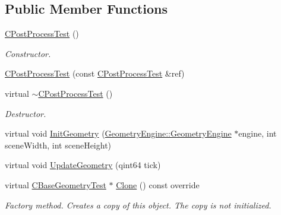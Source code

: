 \subsection*{Public Member Functions}
\begin{DoxyCompactItemize}
\item 
\mbox{\label{class_unit_test_1_1_c_post_process_test_a9e9ed13f9e0dd0322f409a02cab748f5}} 
\mbox{\hyperlink{class_unit_test_1_1_c_post_process_test_a9e9ed13f9e0dd0322f409a02cab748f5}{C\+Post\+Process\+Test}} ()
\begin{DoxyCompactList}\small\item\em Constructor. \end{DoxyCompactList}\item 
\mbox{\hyperlink{class_unit_test_1_1_c_post_process_test_ab432ec90a2fe56772f244e0640d55c37}{C\+Post\+Process\+Test}} (const \mbox{\hyperlink{class_unit_test_1_1_c_post_process_test}{C\+Post\+Process\+Test}} \&ref)
\item 
\mbox{\label{class_unit_test_1_1_c_post_process_test_ab034d618f83ac4640a20b98a3c12b2f2}} 
virtual \mbox{\hyperlink{class_unit_test_1_1_c_post_process_test_ab034d618f83ac4640a20b98a3c12b2f2}{$\sim$\+C\+Post\+Process\+Test}} ()
\begin{DoxyCompactList}\small\item\em Destructor. \end{DoxyCompactList}\item 
virtual void \mbox{\hyperlink{class_unit_test_1_1_c_post_process_test_ab88ae9fbbdcee0f63328d73f9b5e499d}{Init\+Geometry}} (\mbox{\hyperlink{class_geometry_engine_1_1_geometry_engine}{Geometry\+Engine\+::\+Geometry\+Engine}} $\ast$engine, int scene\+Width, int scene\+Height)
\item 
virtual void \mbox{\hyperlink{class_unit_test_1_1_c_post_process_test_aa1da5079813a860b1cc8a3554bce6f04}{Update\+Geometry}} (qint64 tick)
\item 
\mbox{\label{class_unit_test_1_1_c_post_process_test_a04e4f4ce2099cd40cde6cdcb7ac1b596}} 
virtual \mbox{\hyperlink{class_unit_test_1_1_c_base_geometry_test}{C\+Base\+Geometry\+Test}} $\ast$ \mbox{\hyperlink{class_unit_test_1_1_c_post_process_test_a04e4f4ce2099cd40cde6cdcb7ac1b596}{Clone}} () const override
\begin{DoxyCompactList}\small\item\em Factory method. Creates a copy of this object. The copy is not initialized. \end{DoxyCompactList}\end{DoxyCompactItemize}
